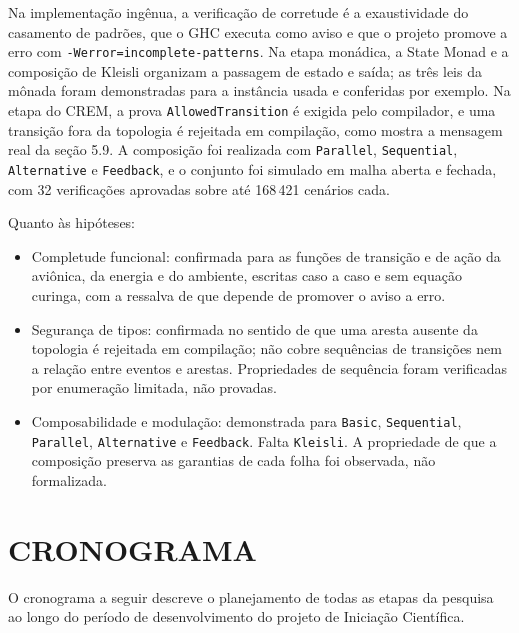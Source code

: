 \documentclass[12pt,a4paper]{article}
\begin{document}
Na implementação ingênua, a verificação de corretude é a exaustividade do casamento de padrões, que o GHC executa como aviso e que o projeto promove a erro com \texttt{-Werror=incomplete-patterns}. Na etapa monádica, a State Monad e a composição de Kleisli organizam a passagem de estado e saída; as três leis da mônada foram demonstradas para a instância usada e conferidas por exemplo. Na etapa do CREM, a prova \texttt{AllowedTransition} é exigida pelo compilador, e uma transição fora da topologia é rejeitada em compilação, como mostra a mensagem real da seção 5.9. A composição foi realizada com \texttt{Parallel}, \texttt{Sequential}, \texttt{Alternative} e \texttt{Feedback}, e o conjunto foi simulado em malha aberta e fechada, com 32 verificações aprovadas sobre até 168\,421 cenários cada.

Quanto às hipóteses:

\begin{itemize}
\item Completude funcional: confirmada para as funções de transição e de ação da aviônica, da energia e do ambiente, escritas caso a caso e sem equação curinga, com a ressalva de que depende de promover o aviso a erro.
\item Segurança de tipos: confirmada no sentido de que uma aresta ausente da topologia é rejeitada em compilação; não cobre sequências de transições nem a relação entre eventos e arestas. Propriedades de sequência foram verificadas por enumeração limitada, não provadas.
\item Composabilidade e modulação: demonstrada para \texttt{Basic}, \texttt{Sequential}, \texttt{Parallel}, \texttt{Alternative} e \texttt{Feedback}. Falta \texttt{Kleisli}. A propriedade de que a composição preserva as garantias de cada folha foi observada, não formalizada.
\end{itemize}

\section{CRONOGRAMA}

O cronograma a seguir descreve o planejamento de todas as etapas da pesquisa ao longo do período de desenvolvimento do projeto de Iniciação Científica.
\end{document}

